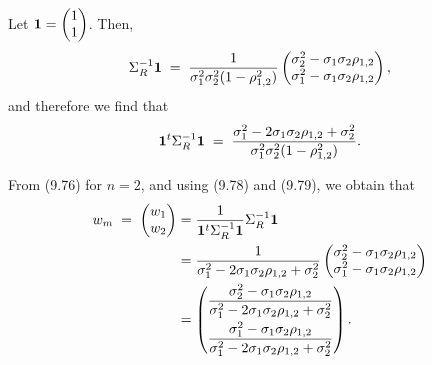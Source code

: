 Let $\mathbf{1} = \begin{pmatrix} 1 \\ 1 \end{pmatrix}$. Then,
\[
\Sigma_R^{-1}\mathbf{1} \;=\; \frac{1}{\sigma_1^2\sigma_2^2(1-\rho_{1,2}^2)}
\begin{pmatrix} \sigma_2^2-\sigma_1\sigma_2\rho_{1,2} \\
\sigma_1^2-\sigma_1\sigma_2\rho_{1,2} \end{pmatrix},
\]
and therefore we find that
\begin{equation}
\mathbf{1}^t\Sigma_R^{-1}\mathbf{1} \;=\; \frac{\sigma_1^2-2\sigma_1\sigma_2\rho_{1,2}+
\sigma_2^2}{\sigma_1^2\sigma_2^2(1-\rho_{1,2}^2)}.
\end{equation}

From (9.76) for $n=2$, and using (9.78) and (9.79), we obtain that
\begin{align*}
w_m \;=\; \begin{pmatrix} w_1 \\ w_2 \end{pmatrix} &=
\frac{1}{\mathbf{1}^t\Sigma_R^{-1}\mathbf{1}}\Sigma_R^{-1}\mathbf{1} \\
&= \frac{1}{\sigma_1^2-2\sigma_1\sigma_2\rho_{1,2}+\sigma_2^2}
\begin{pmatrix} \sigma_2^2-\sigma_1\sigma_2\rho_{1,2} \\
\sigma_1^2-\sigma_1\sigma_2\rho_{1,2} \end{pmatrix} \\
&= \begin{pmatrix}
\dfrac{\sigma_2^2-\sigma_1\sigma_2\rho_{1,2}}{\sigma_1^2-2\sigma_1\sigma_2\rho_{1,2}+
\sigma_2^2} \\[2ex]
\dfrac{\sigma_1^2-\sigma_1\sigma_2\rho_{1,2}}{\sigma_1^2-2\sigma_1\sigma_2\rho_{1,2}+
\sigma_2^2}
\end{pmatrix}.
\end{align*}
